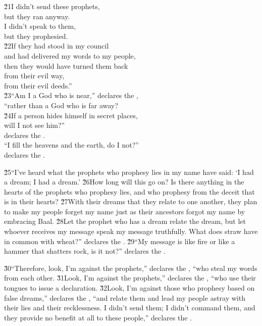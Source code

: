 \begin{poetry}
\poeml \v{21}I didn't send these prophets, \\
\poemll    but they ran anyway. \\
\poeml I didn't speak to them, \\
\poemll    but they prophesied. \\
\poeml \v{22}If they had stood in my council \\
\poemll    and had delivered my words to my people, \\
\poeml then they would have turned them back \\
\poemll    from their evil way, \\
\poemlll       from their evil deeds.'' \\
\poeml \v{23}``Am I a God who is near,'' declares the , \\
\poemll    ``rather than a God who is far away? \\
\poeml \v{24}If a person hides himself in secret places, \\
\poemll    will I not see him?'' \\
\poemlll       declares the . \\
\poeml ``I fill the heavens and the earth, do I not?'' \\
\poemll    declares the .
\end{poetry}

\v{25}``I've heard what the prophets who prophesy lies in my name have said: `I had a dream; I had a dream.' \v{26}How long will this go on? Is there anything in the hearts of the prophets who prophesy lies, and who prophesy from the deceit that is in their hearts? \v{27}With their dreams that they relate to one another, they plan to make my people forget my name just as their ancestors forgot my name by embracing Baal. \v{28}Let the prophet who has a dream relate the dream, but let whoever receives my message speak my message truthfully. What does straw have in common with wheat?'' declares the . \v{29}``My message is like fire or like a hammer that shatters rock, is it not?'' declares the .

\v{30}``Therefore, look, I'm against the prophets,'' declares the , ``who steal my words from each other. \v{31}Look, I'm against the prophets,'' declares the , ``who use their tongues to issue a declaration. \v{32}Look, I'm against those who prophesy based on false dreams,'' declares the , ``and relate them and lead my people astray with their lies and their recklessness. I didn't send them; I didn't command them, and they provide no benefit at all to these people,'' declares the .

